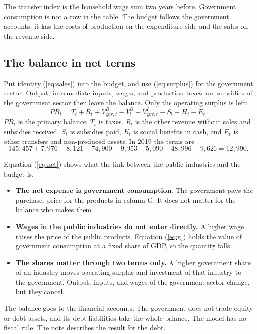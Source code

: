 \documentclass[11pt,a4paper]{article}
\newcommand{\code}[1]{\texttt{\detokenize{#1}}}
\newcommand{\gov}{\mathrm{gov}}
\begin{document}
The transfer index is the household wage sum two years before.
Government consumption is not a row in the table. The budget follows the government accounts: it has the costs of production on the expenditure side and the sales on the revenue side.

\subsection{The balance in net terms}

Put identity (\ref{eq:sales}) into the budget, and use (\ref{eq:surplus}) for the government sector.
Output, intermediate inputs, wages, and production taxes and subsidies of the government sector then leave the balance. Only the operating surplus is left:
\begin{equation}
\mathit{PB}_t = T_t + R_t + V^B_{\gov,t} - V^G_t - V^I_{\gov,t} - S_t - H_t - E_t .
\label{eq:net}
\end{equation}
$\mathit{PB}_t$ is the primary balance. $T_t$ is taxes. $R_t$ is the other revenue without sales and subsidies received.
$S_t$ is subsidies paid, $H_t$ is social benefits in cash, and $E_t$ is other transfers and non-produced assets.
In 2019 the terms are
\[
145{,}457 + 7{,}976 + 8{,}121 - 74{,}900 - 9{,}953 - 5{,}090 - 48{,}996 - 9{,}626 = 12{,}990 .
\]

Equation (\ref{eq:net}) shows what the link between the public industries and the budget is.
\begin{itemize}
\item \textbf{The net expense is government consumption.} The government pays the purchaser price for the products in column G. It does not matter for the balance who makes them.
\item \textbf{Wages in the public industries do not enter directly.} A higher wage raises the price of the public products. Equation (\ref{eq:g}) holds the value of government consumption at a fixed share of GDP, so the quantity falls.
\item \textbf{The shares matter through two terms only.} A higher government share of an industry moves operating surplus and investment of that industry to the government. Output, inputs, and wages of the government sector change, but they cancel.
\end{itemize}

The balance goes to the financial accounts. The government does not trade equity or debt assets, and its debt liabilities take the whole balance.
The model has no fiscal rule. The note \code{mirror_closure.tex} describes the result for the debt.
\end{document}
